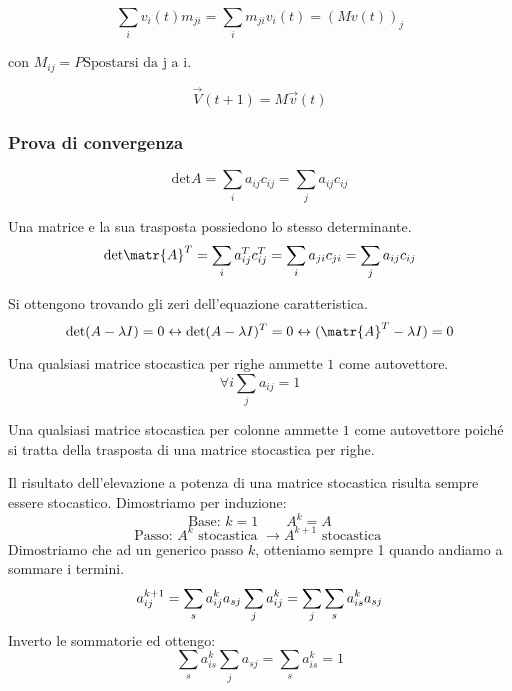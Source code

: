 \documentclass[\main/main.tex]{subfiles}
\begin{document}
\[
	\sum_i v_i(t) m_{ji} = \sum_i m_{ji}v_i(t) = (Mv(t))_j
\]

con $M_{ij} = P \text{Spostarsi da j a i}$.

\[
	\vec{V}(t+1) = M\vec{v}(t)
\]

\subsubsection{Prova di convergenza}

\begin{definition}[Determinante]
	\[
		\text{det}A = \sum_i a_{ij} c_{ij} = \sum_j a_{ij} c_{ij}
	\]
\end{definition}

\begin{definition}
Una matrice e la sua trasposta possiedono lo stesso determinante.
	\[
		\text{det}\matr{A}^T = \sum_i a^T_{ij} c^T_{ij} = \sum_i a_{ji} c_{ji}	 =  \sum_j a_{ij} c_{ij}
	\]
\end{definition}

\begin{definition}[Autovalori]
Si ottengono trovando gli zeri dell'equazione caratteristica.
\[
	\text{det}(A-\lambda I) = 0 \leftrightarrow \text{det}(A-\lambda I)^T = 0 \leftrightarrow  \text(\matr{A}^T-\lambda I) = 0
\]
\end{definition}

\begin{definition}
Una qualsiasi matrice stocastica per righe ammette $1$ come autovettore.
\[
	\forall i \sum_j a_{ij} = 1
\]
\end{definition}

\begin{definition}
Una qualsiasi matrice stocastica per colonne ammette $1$ come autovettore poiché si tratta della trasposta di una matrice stocastica per righe.
\end{definition}

\begin{theorem}
Il risultato dell'elevazione a potenza di una matrice stocastica risulta sempre essere stocastico. Dimostriamo per induzione:
\[
	\text{Base: } k=1 \qquad A^k = A
\]
\[
	\text{Passo: } A^k \text{ stocastica } \rightarrow A^{k+1} \text{ stocastica }
\]
Dimostriamo che ad un generico passo $k$, otteniamo sempre 1 quando andiamo a sommare i termini.
\[
	a_{ij}^{k+1} = \sum_s a^k_{ij} a_{sj}\\
	\sum_j a^k_{ij} = \sum_j \sum_s a^k_{is}a_{sj}
\]
Inverto le sommatorie ed ottengo:
\[
	\sum_s a_{is}^k \sum_j a_{sj} = \sum_s a^k_{is} = 1
\]
\end{theorem}
\end{document}

